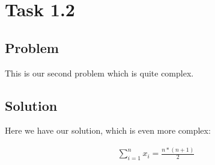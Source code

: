 \section*{Task 1.2}
\subsection*{Problem}
This is our second problem which is quite complex.

\subsection*{Solution}
Here we have our solution, which is even more complex:

\begin{align*}
\sum_{i=1}^{n}x_{i}= \frac{n*(n+1)}{2}\\
\end{align*}

